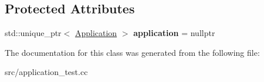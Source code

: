 \subsection*{Protected Attributes}
\begin{DoxyCompactItemize}
\item 
\hypertarget{class_application_test_ad1a2c933b0b58c4f23d7a1b51bcc30b9}{}\label{class_application_test_ad1a2c933b0b58c4f23d7a1b51bcc30b9} 
std\+::unique\+\_\+ptr$<$ \hyperlink{classae_1_1_application}{Application} $>$ {\bfseries application} = nullptr
\end{DoxyCompactItemize}


The documentation for this class was generated from the following file\+:\begin{DoxyCompactItemize}
\item 
src/application\+\_\+test.\+cc\end{DoxyCompactItemize}
